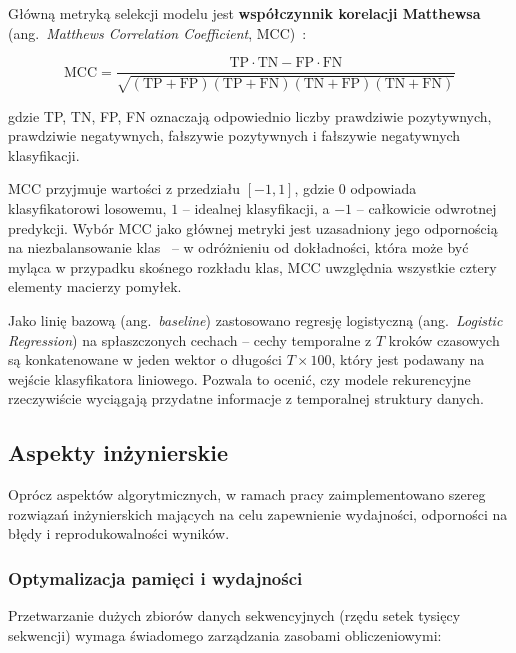 Główną metryką selekcji modelu jest \textbf{współczynnik korelacji Matthewsa} (ang.~\emph{Matthews Correlation Coefficient}, MCC)~\cite{matthews1975mcc}:

\begin{equation}
\label{eq:mcc-impl}
\text{MCC} = \frac{\text{TP} \cdot \text{TN} - \text{FP} \cdot \text{FN}}{\sqrt{(\text{TP} + \text{FP})(\text{TP} + \text{FN})(\text{TN} + \text{FP})(\text{TN} + \text{FN})}}
\end{equation}

\noindent gdzie TP, TN, FP, FN oznaczają odpowiednio liczby prawdziwie pozytywnych, prawdziwie negatywnych, fałszywie pozytywnych i fałszywie negatywnych klasyfikacji.

MCC przyjmuje wartości z przedziału $[-1, 1]$, gdzie $0$ odpowiada klasyfikatorowi losowemu, $1$ -- idealnej klasyfikacji, a $-1$ -- całkowicie odwrotnej predykcji. Wybór MCC jako głównej metryki jest uzasadniony jego odpornością na niezbalansowanie klas~\cite{chicco2020mcc} -- w odróżnieniu od dokładności, która może być myląca w przypadku skośnego rozkładu klas, MCC uwzględnia wszystkie cztery elementy macierzy pomyłek.

Jako linię bazową (ang.~\emph{baseline}) zastosowano regresję logistyczną (ang.~\emph{Logistic Regression}) na spłaszczonych cechach -- cechy temporalne z $T$ kroków czasowych są konkatenowane w jeden wektor o długości $T \times 100$, który jest podawany na wejście klasyfikatora liniowego. Pozwala to ocenić, czy modele rekurencyjne rzeczywiście wyciągają przydatne informacje z temporalnej struktury danych.

\subsection{Aspekty inżynierskie}
\label{subsec:aspekty-inzynierskie}

Oprócz aspektów algorytmicznych, w ramach pracy zaimplementowano szereg rozwiązań inżynierskich mających na celu zapewnienie wydajności, odporności na błędy i reprodukowalności wyników.

\subsubsection{Optymalizacja pamięci i wydajności}
\label{subsubsec:optymalizacja}

Przetwarzanie dużych zbiorów danych sekwencyjnych (rzędu setek tysięcy sekwencji) wymaga świadomego zarządzania zasobami obliczeniowymi:

